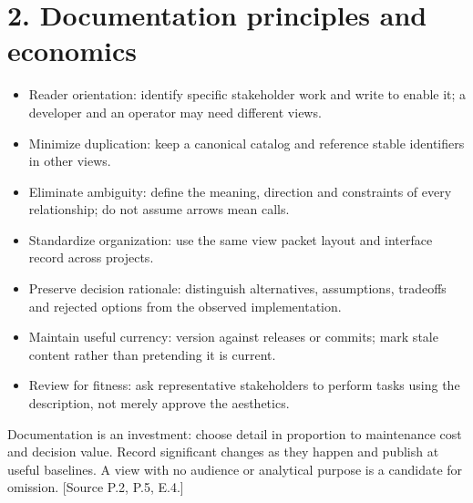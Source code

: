 \documentclass[11pt,letterpaper]{article}
\begin{document}
\section*{2. Documentation principles and economics}
\begin{itemize}
\item Reader orientation: identify specific stakeholder work and write to enable it; a developer and an operator may need different views.
\item Minimize duplication: keep a canonical catalog and reference stable identifiers in other views.
\item Eliminate ambiguity: define the meaning, direction and constraints of every relationship; do not assume arrows mean calls.
\item Standardize organization: use the same view packet layout and interface record across projects.
\item Preserve decision rationale: distinguish alternatives, assumptions, tradeoffs and rejected options from the observed implementation.
\item Maintain useful currency: version against releases or commits; mark stale content rather than pretending it is current.
\item Review for fitness: ask representative stakeholders to perform tasks using the description, not merely approve the aesthetics.
\end{itemize}
Documentation is an investment: choose detail in proportion to maintenance cost and decision value. Record significant changes as they happen and publish at useful baselines. A view with no audience or analytical purpose is a candidate for omission. [Source P.2, P.5, E.4.]\par\smallskip
\end{document}
